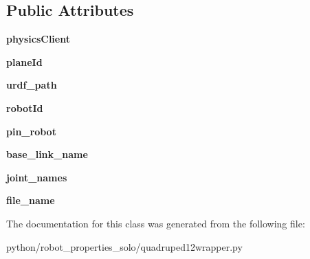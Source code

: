 \subsection*{Public Attributes}
\begin{DoxyCompactItemize}
\item 
\mbox{\label{classrobot__properties__solo_1_1quadruped12wrapper_1_1Quadruped12Robot_ab6d29b4091159910881859164306f70d}} 
{\bfseries physics\+Client}
\item 
\mbox{\label{classrobot__properties__solo_1_1quadruped12wrapper_1_1Quadruped12Robot_a0ba27c6cd4af635b567768e82dbcd277}} 
{\bfseries plane\+Id}
\item 
\mbox{\label{classrobot__properties__solo_1_1quadruped12wrapper_1_1Quadruped12Robot_a7f1e81a0c8e5ce4fa73128cad591e286}} 
{\bfseries urdf\+\_\+path}
\item 
\mbox{\label{classrobot__properties__solo_1_1quadruped12wrapper_1_1Quadruped12Robot_a63a931889c1a2fd6863aece3addfa12d}} 
{\bfseries robot\+Id}
\item 
\mbox{\label{classrobot__properties__solo_1_1quadruped12wrapper_1_1Quadruped12Robot_a0cbb9424a773b7c9b8000a17ce832b58}} 
{\bfseries pin\+\_\+robot}
\item 
\mbox{\label{classrobot__properties__solo_1_1quadruped12wrapper_1_1Quadruped12Robot_a57d5f3a7ccd3746987de40e02244bf19}} 
{\bfseries base\+\_\+link\+\_\+name}
\item 
\mbox{\label{classrobot__properties__solo_1_1quadruped12wrapper_1_1Quadruped12Robot_ad203f83c70bea7d6427df5a823abd178}} 
{\bfseries joint\+\_\+names}
\item 
\mbox{\label{classrobot__properties__solo_1_1quadruped12wrapper_1_1Quadruped12Robot_a2eee41ceae2b7948c09f894e9b371c17}} 
{\bfseries file\+\_\+name}
\end{DoxyCompactItemize}


The documentation for this class was generated from the following file\+:\begin{DoxyCompactItemize}
\item 
python/robot\+\_\+properties\+\_\+solo/quadruped12wrapper.\+py\end{DoxyCompactItemize}
